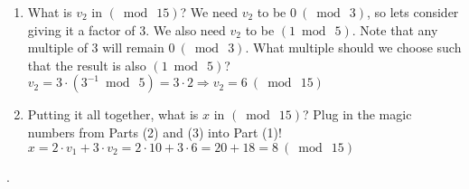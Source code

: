 \documentclass[11pt, preview]{standalone} %
\begin{document}
\begin{enumerate}
\item \begin{Freeform}{6}
	What is $v_2$ in $(\bmod \ 15)$? 
	\Hint We need $v_2$ to be $0 \ (\bmod \ 3)$, so lets consider giving it a factor of $3$. We also need $v_2$ to be $(1 \bmod \ 5)$. Note that any multiple of $3$ will remain $0 \ (\bmod \ 3)$. What multiple should we choose such that the result is also $(1 \bmod \ 5)$?
	\Solution $v_2 = 3 \cdot (3^{-1} \bmod \ 5) = 3 \cdot 2 \Rightarrow v_2 = 6 \ (\bmod \ 15)$
	\end{Freeform}

\item \begin{Freeform}{8}
	Putting it all together, what is $x$ in $(\bmod \ 15)$? 
	\Hint Plug in the magic numbers from Parts (2) and (3) into Part (1)!
	\Solution $x = 2 \cdot v_1+3 \cdot v_2 = 2 \cdot 10 + 3 \cdot 6 = 20 + 18 =  8 \ (\bmod \ 15)$
	\end{Freeform}

\end{enumerate}

.
\end{document}
